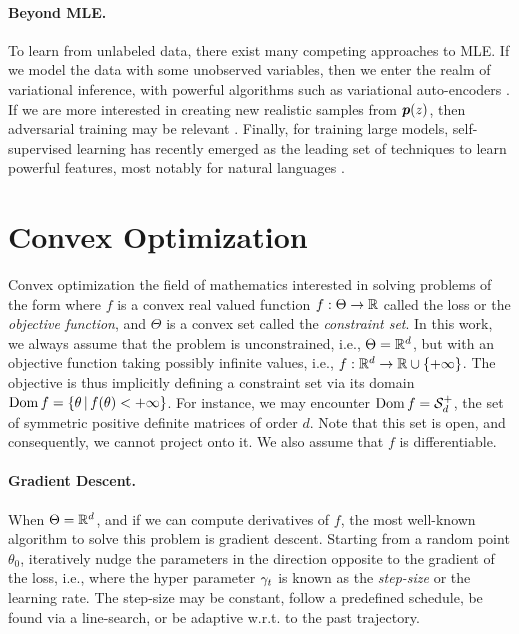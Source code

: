 \paragraph{Beyond MLE.}
To learn from unlabeled data, there exist many competing approaches to MLE.
If we model the data with some unobserved variables, then we enter the realm of variational inference, with powerful algorithms such as variational auto-encoders \citep{kingma2013auto}.
If we are more interested in creating new realistic samples from $\bm{p}(z)$, then adversarial training may be relevant \citep{goodfellow2014generative}.
Finally, for training large models, self-supervised learning has recently emerged as the leading set of techniques to learn powerful features, most notably for natural languages \citep{peters2018deep,devlin2018bert}.


\section{Convex Optimization}
Convex optimization the field of mathematics interested in solving problems of the form
where $f$ is a convex real valued function $f:\Theta \rightarrow \mathbb{R}$ called the loss or the \emph{objective function}, and $\Theta$ is a convex set called the \emph{constraint set}.
In this work, we always assume that the problem is unconstrained, i.e., $\Theta = \mathbb{R}^d$,
but with an objective function taking possibly infinite values, i.e., $f: \mathbb{R}^d \rightarrow \mathbb{R} \cup \{+\infty\}$.
The objective is thus implicitly defining a constraint set via its domain $\operatorname{\mathrm{Dom}} f = \{ \theta \,\vert\, f(\theta) < +\infty \}$.
For instance, we may encounter $\operatorname{\mathrm{Dom}} f = {\mathcal S}_d^+$, the set of symmetric positive definite matrices of order $d$. Note that this set is open, and consequently, we cannot project onto it.
We also assume that $f$ is differentiable.

\paragraph{Gradient Descent.}
When $\Theta = \mathbb{R}^d$, and if we can compute derivatives of $f$, the most well-known algorithm to solve this problem is gradient descent.
Starting from a random point $\theta_0$, iteratively nudge the parameters in the direction opposite to the gradient of the loss, i.e.,
where the hyper parameter $\gamma_t$ is known as the \emph{step-size} or the learning rate.
The step-size may be constant, follow a predefined schedule, be found via a line-search, or be adaptive w.r.t. to the past trajectory.

